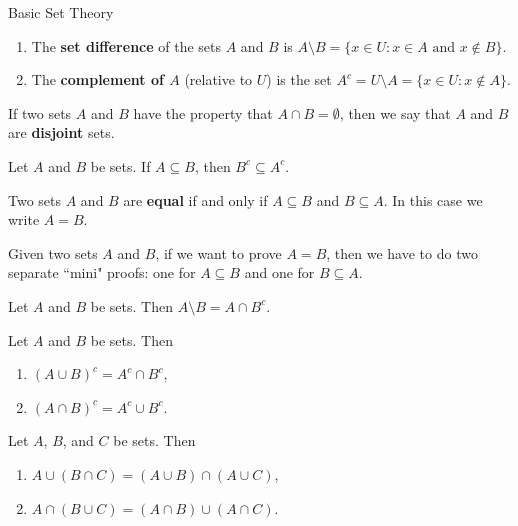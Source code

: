 \begin{section}{Basic Set Theory}
\begin{definition}
\begin{enumerate}
\item The \textbf{set difference} of the sets $A$ and $B$ is $A \setminus B =\{x\in U : x\in A \mbox{ and } x\notin B \}$.

\item The \textbf{complement of $A$} (relative to $U$) is the set $A^c=U \setminus A =\{x \in U : x \notin A\}$.
\end{enumerate}
\end{definition}

\begin{definition}
If two sets $A$ and $B$ have the property that $A \cap B = \emptyset$, then we say that $A$ and $B$ are \textbf{disjoint} sets.
\end{definition}

\begin{theorem}
Let $A$ and $B$ be sets.  If $A \subseteq B$, then $B^c \subseteq A^c$.
\end{theorem}

\begin{definition}
Two sets $A$ and $B$ are \textbf{equal} if and only if $A \subseteq B$ and $B \subseteq A$.  In this case we write $A = B$.
\end{definition}

\begin{remark}
Given two sets $A$ and $B$, if we want to prove $A=B$, then we have to do two separate ``mini" proofs: one for $A\subseteq B$ and one for $B\subseteq A$.
\end{remark}

\begin{theorem}
Let $A$ and $B$ be sets.  Then $A\setminus B = A \cap B^c$.
\end{theorem}

\begin{theorem}
Let $A$ and $B$ be sets. Then 
\begin{enumerate}
\item $(A \cup B)^c = A^c \cap B^c$,
\item $(A \cap B)^c = A^c \cup B^c$.
\end{enumerate}
\end{theorem}

\begin{theorem}
Let $A$, $B$, and $C$ be sets. Then
\begin{enumerate}
\item $A \cup(B\cap C) = (A\cup B)\cap (A\cup C)$,
\item $A\cap (B\cup C)= (A\cap B)\cup (A\cap C)$.
\end{enumerate}
\end{theorem}


\end{section}
